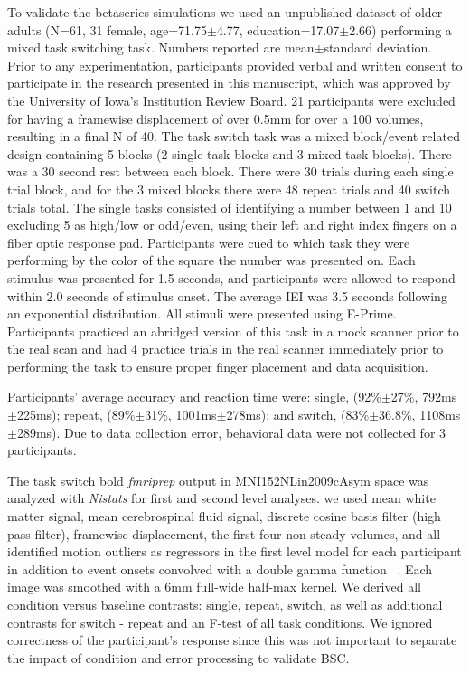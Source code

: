 \documentclass[10pt,letterpaper]{article}
\begin{document}
To validate the betaseries simulations we used an unpublished dataset
of older adults (N=61, 31 female, age=71.75$\pm$4.77, education=17.07$\pm$2.66)
performing a mixed task switching task.
Numbers reported are mean$\pm$standard deviation.
Prior to any experimentation, participants provided verbal and written consent
to participate in the research presented in this manuscript, which was approved
by the University of Iowa's Institution Review Board.
21 participants were excluded for having a framewise displacement of over 0.5mm for
over a 100 volumes, resulting in a final N of 40.
The task switch task was a mixed block/event related design containing
5 blocks (2 single task blocks and 3 mixed task blocks).
There was a 30 second rest between each block.
There were 30 trials during each single trial block,
and for the 3 mixed blocks there were 48 repeat trials and 40 switch trials total.
The single tasks consisted of identifying a number between
1 and 10 excluding 5 as high/low or odd/even, using their left and right index fingers
on a fiber optic response pad.
Participants were cued to which task they were performing by the color of the square
the number was presented on.
Each stimulus was presented for 1.5 seconds, and participants were allowed
to respond within 2.0 seconds of stimulus onset.
The average IEI was 3.5 seconds following an exponential distribution.
All stimuli were presented using E-Prime.
Participants practiced an abridged version of this task in a mock scanner
prior to the real scan and had 4 practice trials in the real scanner immediately
prior to performing the task to ensure proper finger placement and data acquisition.

Participants' average accuracy and reaction time were:
single, (92\%$\pm$27\%, 792ms$\pm$225ms); repeat, (89\%$\pm$31\%, 1001ms$\pm$278ms);
and switch, (83\%$\pm$36.8\%, 1108ms$\pm$289ms).
Due to data collection error, behavioral data were not collected for 3 participants.

The task switch bold \emph{fmriprep} output in MNI152NLin2009cAsym space
was analyzed with \emph{Nistats} for first and second level analyses.
we used mean white matter signal, mean cerebrospinal fluid signal,
discrete cosine basis filter (high pass filter), framewise displacement, the first four non-steady volumes, and
all identified motion outliers as regressors in the first level model for each participant
in addition to event onsets convolved with a double gamma function ~\cite{Glover1999}.
Each image was smoothed with a 6mm full-wide half-max kernel.
We derived all condition versus baseline contrasts: single, repeat, switch, as well as
additional contrasts for switch - repeat and an F-test of all task conditions.
We ignored correctness of the participant's response since this was not important to
separate the impact of condition and error processing to validate BSC.
\end{document}
